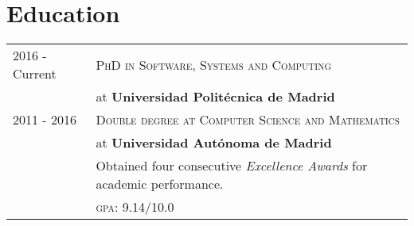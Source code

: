 \documentclass[a4paper,10pt]{article} %
\begin{document}
\section{Education}
\begin{tabular}{p{2.5cm}p{13.2cm}}
\small{2016 - Current} & \textsc{PhD in Software, Systems and Computing} \\
& at \textbf{Universidad Politécnica de Madrid}\\
[3pt]
\small{2011 - 2016} & \textsc{Double degree at Computer Science and Mathematics}\\
& at \textbf{Universidad Autónoma de Madrid} \\
& Obtained four consecutive \emph{Excellence Awards} for academic performance. \\
& \normalsize \textsc{gpa}: 9.14/10.0
\end{tabular}
\end{document}
